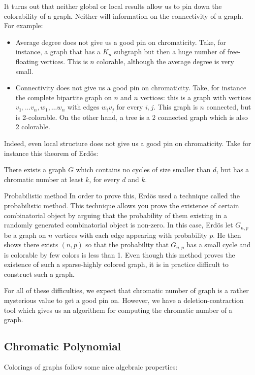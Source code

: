 It turns out that neither global or local results allow us to pin down the colorability of a graph. Neither will information on the connectivity of a graph. For example:
\begin{itemize}
 \item Average degree does not give us a good pin on chromaticity. Take, for instance, a graph that has a $K_n$ subgraph but then a huge number of free-floating vertices. This is $n$ colorable, although the average degree is very small. 
 \item Connectivity does not give us a good pin on chromaticity. Take, for instance the complete bipartite graph on $n$ and $n$ vertices: this is a graph with vertices $v_1, \ldots v_n, w_1, \ldots w_n$ with edges $w_iv_j$ for every $i, j$. This graph is $n$ connected, but is 2-colorable. On the other hand, a tree is a 2 connected graph which is also 2 colorable. 
\end{itemize}

Indeed, even local structure does not give us a good pin on chromaticity. Take for instance this theorem of Erd\"os:
\begin{theorem} \label{proj:probmethod}
 There exists a graph $G$ which contains no cycles of size smaller than $d$, but has a chromatic number at least $k$, for every $d$ and $k$. 
\end{theorem}
\begin{projectdescription}{Probabilistic method}
In order to prove this, Erd\"os used a technique called the probabilistic method. This technique allows you prove the existence of certain combinatorial object by arguing that the probability of them existing in a randomly generated combinatorial object is non-zero. In this case, Erd\"os 
let $G_{n,p}$ be a graph on $n$ vertices with each edge appearing with probability $p$. He then shows there exists $(n, p)$ so that the probability that $G_{n,p}$ has a small cycle and is colorable by few colors is less than 1. 
Even though this method proves the existence of such a sparse-highly colored graph, it is in practice difficult to construct such a graph. 
\end{projectdescription}

For all of these difficulties, we expect that chromatic number of graph is a rather mysterious value to get a good pin on. However, we have a deletion-contraction tool which gives us an algorithem for computing the chromatic number of a graph.  
\subsection{Chromatic Polynomial}
Colorings of graphs follow some nice algebraic properties:

